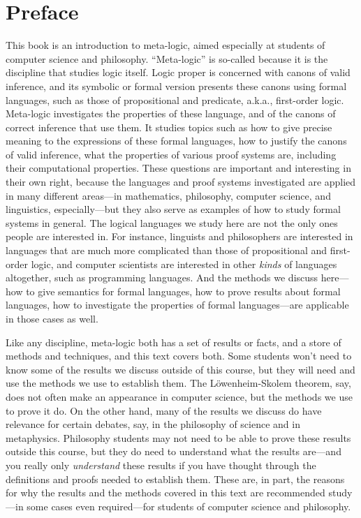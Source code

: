 \chapter{Preface}

This book is an introduction to meta-logic, aimed especially at
students of computer science and philosophy.  ``Meta-logic'' is
so-called because it is the discipline that studies logic itself.
Logic proper is concerned with canons of valid inference, and its
symbolic or formal version presents these canons using formal
languages, such as those of propositional and predicate, a.k.a.,
first-order logic.  Meta-logic investigates the properties of these
language, and of the canons of correct inference that use them.  It
studies topics such as how to give precise meaning to the expressions
of these formal languages, how to justify the canons of valid
inference, what the properties of various proof systems are, including
their computational properties.  These questions are important and
interesting in their own right, because the languages and proof
systems investigated are applied in many different areas---in
mathematics, philosophy, computer science, and linguistics,
especially---but they also serve as examples of how to study formal
systems in general.  The logical languages we study here are not the
only ones people are interested in.  For instance, linguists and
philosophers are interested in languages that are much more
complicated than those of propositional and first-order logic, and
computer scientists are interested in other \emph{kinds} of languages
altogether, such as programming languages.  And the methods we discuss
here---how to give semantics for formal languages, how to prove
results about formal languages, how to investigate the properties of
formal languages---are applicable in those cases as well.

Like any discipline, meta-logic both has a set of results or facts,
and a store of methods and techniques, and this text covers both.
Some students won't need to know some of the results we discuss
outside of this course, but they will need and use the methods we use
to establish them.  The L\"owenheim-Skolem theorem, say, does not
often make an appearance in computer science, but the methods we use
to prove it do.  On the other hand, many of the results we discuss do
have relevance for certain debates, say, in the philosophy of science
and in metaphysics. Philosophy students may not need to be able to
prove these results outside this course, but they do need to
understand what the results are---and you really only
\emph{understand} these results if you have thought through the
definitions and proofs needed to establish them.  These are, in part,
the reasons for why the results and the methods covered in this text
are recommended study---in some cases even required---for students of
computer science and philosophy.

